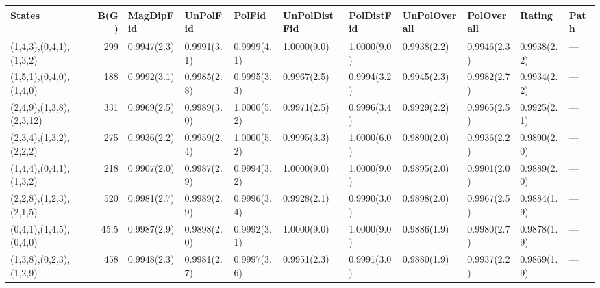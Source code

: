 \begin{tabular}{lrlllllllll}
\hline
 States                   &   B(G) & MagDipFid   & UnPolFid    & PolFid      & UnPolDistFid   & PolDistFid   & UnPolOverall   & PolOverall   & Rating      & Path   \\
\hline
 (1,4,3),(0,4,1),(1,3,2)  &  299   & 0.9947(2.3) & 0.9991(3.1) & 0.9999(4.1) & 1.0000(9.0)    & 1.0000(9.0)  & 0.9938(2.2)    & 0.9946(2.3)  & 0.9938(2.2) & ---    \\
 (1,5,1),(0,4,0),(1,4,0)  &  188   & 0.9992(3.1) & 0.9985(2.8) & 0.9995(3.3) & 0.9967(2.5)    & 0.9994(3.2)  & 0.9945(2.3)    & 0.9982(2.7)  & 0.9934(2.2) & ---    \\
 (2,4,9),(1,3,8),(2,3,12) &  331   & 0.9969(2.5) & 0.9989(3.0) & 1.0000(5.2) & 0.9971(2.5)    & 0.9996(3.4)  & 0.9929(2.2)    & 0.9965(2.5)  & 0.9925(2.1) & ---    \\
 (2,3,4),(1,3,2),(2,2,2)  &  275   & 0.9936(2.2) & 0.9959(2.4) & 1.0000(5.2) & 0.9995(3.3)    & 1.0000(6.0)  & 0.9890(2.0)    & 0.9936(2.2)  & 0.9890(2.0) & ---    \\
 (1,4,4),(0,4,1),(1,3,2)  &  218   & 0.9907(2.0) & 0.9987(2.9) & 0.9994(3.2) & 1.0000(9.0)    & 1.0000(9.0)  & 0.9895(2.0)    & 0.9901(2.0)  & 0.9889(2.0) & ---    \\
 (2,2,8),(1,2,3),(2,1,5)  &  520   & 0.9981(2.7) & 0.9989(2.9) & 0.9996(3.4) & 0.9928(2.1)    & 0.9990(3.0)  & 0.9898(2.0)    & 0.9967(2.5)  & 0.9884(1.9) & ---    \\
 (0,4,1),(1,4,5),(0,4,0)  &   45.5 & 0.9987(2.9) & 0.9898(2.0) & 0.9992(3.1) & 1.0000(9.0)    & 1.0000(9.0)  & 0.9886(1.9)    & 0.9980(2.7)  & 0.9878(1.9) & ---    \\
 (1,3,8),(0,2,3),(1,2,9)  &  458   & 0.9948(2.3) & 0.9981(2.7) & 0.9997(3.6) & 0.9951(2.3)    & 0.9991(3.0)  & 0.9880(1.9)    & 0.9937(2.2)  & 0.9869(1.9) & ---    \\
\hline
\end{tabular}